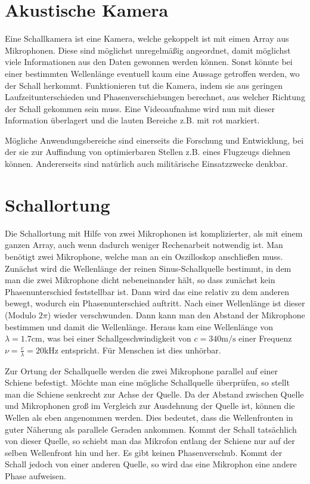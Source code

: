 \documentclass[12pt,a4paper,titlepage,headinclude,bibtotoc]{scrartcl}
\begin{document}
\section{Akustische Kamera}
Eine Schallkamera ist eine Kamera, welche gekoppelt ist mit eimen Array aus Mikrophonen.
Diese sind möglichst unregelmäßig angeordnet, damit möglichst viele Informationen aus den Daten gewonnen werden können.
Sonst könnte bei einer bestimmten Wellenlänge eventuell kaum eine Aussage getroffen werden, wo der Schall herkommt.
Funktionieren tut die Kamera, indem sie aus geringen Laufzeitunterschieden und Phasenverschiebungen berechnet, aus welcher Richtung der Schall gekommen sein muss.
Eine Videoaufnahme wird nun mit dieser Information überlagert und die lauten Bereiche z.B. mit rot markiert.

Mögliche Anwendungsbereiche sind einerseits die Forschung und Entwicklung, bei der sie zur Auffindung von optimierbaren Stellen z.B. eines Flugzeugs diehnen können.
Andererseits sind natürlich auch militärische Einsatzzwecke denkbar.


\section{Schallortung}
Die Schallortung mit Hilfe von zwei Mikrophonen ist komplizierter, als mit einem ganzen Array, auch wenn dadurch weniger Rechenarbeit notwendig ist.
Man benötigt zwei Mikrophone, welche man an ein Oszilloskop anschließen muss.
Zunächst wird die Wellenlänge der reinen Sinus-Schallquelle bestimmt, in dem man die zwei Mikrophone dicht nebeneinander hält, so dass zunächst kein Phasenunterschied feststellbar ist.
Dann wird das eine relativ zu dem anderen bewegt, wodurch ein Phasenunterschied auftritt.
Nach einer Wellenlänge ist dieser (Modulo $2\pi$) wieder verschwunden.
Dann kann man den Abstand der Mikrophone bestimmen und damit die Wellenlänge.
Heraus kam eine Wellenlänge von $\lambda=1.7\si{\centi\meter}$, was bei einer Schallgeschwindigkeit von $c=340\si{\meter\per\second}$ einer Frequenz $\nu=\frac{c}{\lambda}=20\si{\kilo\hertz}$ entspricht.
Für Menschen ist dies unhörbar.

Zur Ortung der Schallquelle werden die zwei Mikrophone parallel auf einer Schiene befestigt.
Möchte man eine mögliche Schallquelle überprüfen, so stellt man die Schiene senkrecht zur Achse der Quelle.
Da der Abstand zwischen Quelle und Mikrophonen groß im Vergleich zur Ausdehnung der Quelle ist, können die Wellen als eben angenommen werden.
Dies bedeutet, dass die Wellenfronten in guter Näherung als parallele Geraden ankommen.
Kommt der Schall tatsächlich von dieser Quelle, so schiebt man das Mikrofon entlang der Schiene nur auf der selben Wellenfront hin und her.
Es gibt keinen Phasenverschub.
Kommt der Schall jedoch von einer anderen Quelle, so wird das eine Mikrophon eine andere Phase aufweisen.
\end{document}

